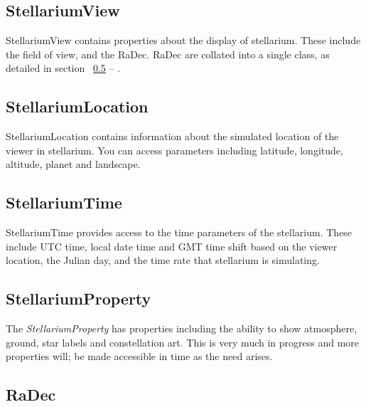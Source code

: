 \subsection{StellariumView}
StellariumView contains properties about the display of stellarium. These include the field of view, and the RaDec. RaDec are collated into a single class, as detailed in section ~\ref{sec:RaDec} --
\emph{}. 

\subsection{StellariumLocation}
StellariumLocation contains information about the simulated location of the viewer in stellarium. You can access parameters including latitude, longitude, altitude, planet and landscape.

\subsection{StellariumTime}
StellariumTime provides access to the time parameters of the stellarium.  These include UTC time, local date time and GMT time shift based on the viewer location, the Julian day, and the time rate that stellarium is simulating.

\subsection{StellariumProperty}
The \textit{StellariumProperty} has properties including the ability to show atmosphere, ground, star labels and constellation art. This is very much in progress and more properties will; be made accessible in time as the need arises.



\subsection{RaDec}\label{sec:RaDec}